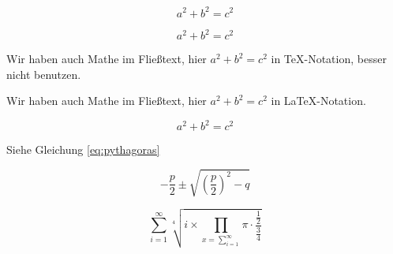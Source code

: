 \documentclass[12pt,ngerman,parskip=half]{scrartcl}
\begin{document}
\blindtext

\[ a^2 + b^2 = c^2 \]

$$ a^2 + b^2 = c^2$$

Wir haben auch Mathe im Fließtext, hier $a^2+b^2=c^2$ in \TeX-Notation, besser nicht benutzen.

Wir haben auch Mathe im Fließtext, hier \(a^2+b^2=c^2\) in \LaTeX-Notation.

\begin{equation}\label{eq:pythagoras}
 a^2 + b^2 = c^2
\end{equation}

Siehe Gleichung \ref{eq:pythagoras}

\begin{equation}\label{eq:pq}
-\frac{p}{2}\pm \sqrt{ \left(\frac{p}{2}\right)^2 - q }
\end{equation}

\begin{equation}
\sum_{i=1}^{\infty} \sqrt[4]{i\times \prod_{x=\sum_{i=1}^{\infty}} \pi \cdot
\frac{\frac{1}{2}}{\frac{3}{4}}
}
\end{equation}



\blindtext
\end{document}

